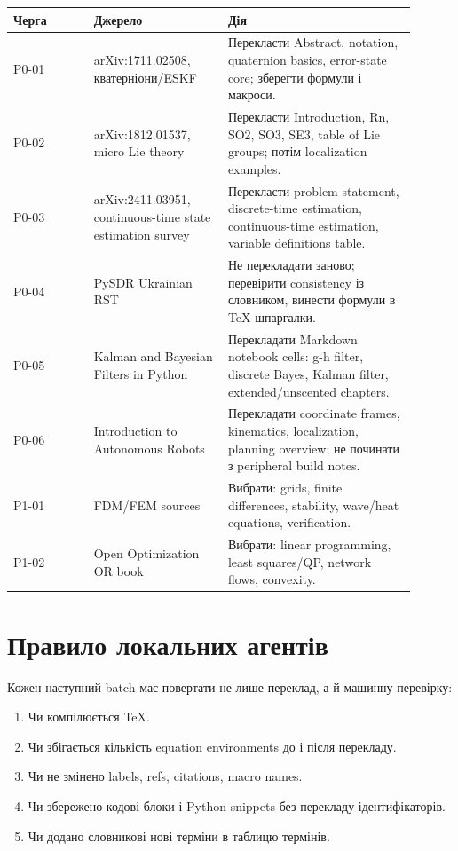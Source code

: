 \begin{longtable}{L{0.18\linewidth}L{0.30\linewidth}L{0.42\linewidth}}
\toprule
\textbf{Черга} & \textbf{Джерело} & \textbf{Дія}\\
\midrule
P0-01 & arXiv:1711.02508, кватерніони/ESKF & Перекласти Abstract, notation, quaternion basics, error-state core; зберегти формули і макроси.\\
P0-02 & arXiv:1812.01537, micro Lie theory & Перекласти Introduction, Rn, SO2, SO3, SE3, table of Lie groups; потім localization examples.\\
P0-03 & arXiv:2411.03951, continuous-time state estimation survey & Перекласти problem statement, discrete-time estimation, continuous-time estimation, variable definitions table.\\
P0-04 & PySDR Ukrainian RST & Не перекладати заново; перевірити consistency із словником, винести формули в TeX-шпаргалки.\\
P0-05 & Kalman and Bayesian Filters in Python & Перекладати Markdown notebook cells: g-h filter, discrete Bayes, Kalman filter, extended/unscented chapters.\\
P0-06 & Introduction to Autonomous Robots & Перекладати coordinate frames, kinematics, localization, planning overview; не починати з peripheral build notes.\\
P1-01 & FDM/FEM sources & Вибрати: grids, finite differences, stability, wave/heat equations, verification.\\
P1-02 & Open Optimization OR book & Вибрати: linear programming, least squares/QP, network flows, convexity.\\
\bottomrule
\end{longtable}

\section{Правило локальних агентів}

Кожен наступний batch має повертати не лише переклад, а й машинну перевірку:

\begin{enumerate}[label=\arabic*.]
  \item Чи компілюється TeX.
  \item Чи збігається кількість equation environments до і після перекладу.
  \item Чи не змінено labels, refs, citations, macro names.
  \item Чи збережено кодові блоки і Python snippets без перекладу ідентифікаторів.
  \item Чи додано словникові нові терміни в таблицю термінів.
\end{enumerate}

